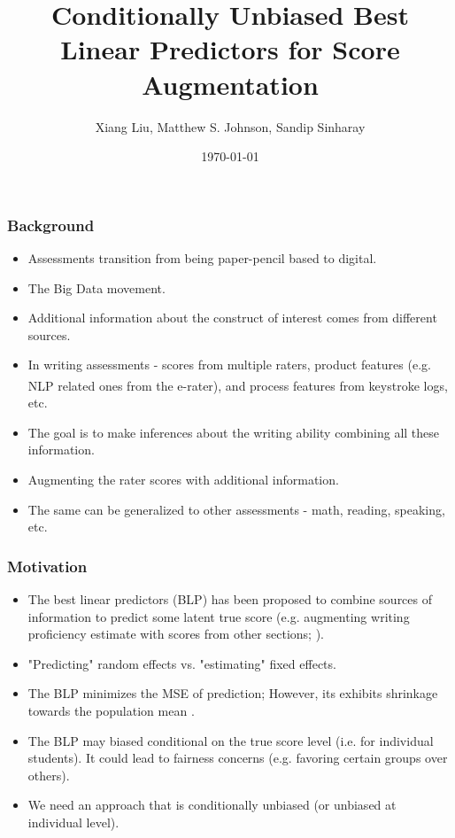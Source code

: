 \documentclass{beamer}
\title{Conditionally Unbiased Best Linear Predictors for Score Augmentation}
\author{Xiang Liu, Matthew S. Johnson, Sandip Sinharay}
\institute{Educational Testing Service}
\date{\today}
\begin{document}
	\frame{\titlepage}

	\begin{frame}[t]\frametitle{Background}
	\begin{itemize}
		\item Assessments transition from being paper-pencil based to digital.
		\item The Big Data movement.
		\item Additional information about the construct of interest comes from
		different sources.
		\item In writing assessments - scores from multiple raters, product features
		(e.g. NLP related ones from the e-rater\textsuperscript{\textregistered}),
		and process features from keystroke logs, etc.
		\item The goal is to make inferences about the writing ability combining all
		these information.
		\item Augmenting the rater scores with additional information.
		\item The same can be generalized to other assessments - math, reading,
		speaking, etc.
	\end{itemize}
	\end{frame}

	\begin{frame}[t]\frametitle{Motivation}
	\begin{itemize}
		\item The best linear predictors (BLP) has been proposed to combine sources
		of information to predict some latent true score (e.g. augmenting writing
		proficiency estimate with scores from other sections; 
		\cite{Haberman2015,Yao2019}).
		\item "Predicting" random effects vs. "estimating" fixed effects.
		\item The BLP minimizes the MSE of prediction; However, its exhibits
		shrinkage towards the population mean \parencite{Robinson1991}.
		\item The BLP may biased conditional on the true score level (i.e. for 
		individual students). It could lead to fairness concerns (e.g. favoring
		certain groups over others). 
		\item We need an approach that is conditionally unbiased (or unbiased at
		individual level).
	\end{itemize}
	\end{frame}
\end{document}
